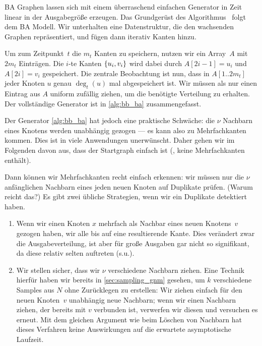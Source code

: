 BA Graphen lassen sich mit einem überraschend einfachen Generator in Zeit linear in der Ausgabegröße erzeugen.
Das Grundgerüst des Algorithmus~\cite{batagelj2005efficient} folgt dem BA Modell.
Wir unterhalten eine Datenstruktur, die den wachsenden Graphen repräsentiert, und fügen dann iterativ Kanten hinzu.

Um zum Zeitpunkt~$t$ die $m_t$ Kanten zu speichern, nutzen wir ein Array~$A$ mit $2m_t$ Einträgen.
Die $i$-te Kanten $\left\{u_i, v_i\right\}$ wird dabei durch $A[2i - 1] = u_i$ und $A[2i] = v_i$ gespeichert.
Die zentrale Beobachtung ist nun, dass in $A[1 .. 2m_t]$ jeder Knoten $u$ genau $\deg_t(u)$ mal abgespeichert ist.
Wir müssen als nur einen Eintrag aus $A$ uniform zufällig ziehen, um die benötigte Verteilung zu erhalten.
Der vollständige Generator ist in \cref{alg:bb_ba} zusammengefasst.

Der Generator \cref{alg:bb_ba} hat jedoch eine praktische Schwäche:
die $\nu$ Nachbarn eines Knotens werden unabhängig gezogen --- es kann also zu Mehrfachkanten kommen.
Dies ist in viele Anwendungen unerwünscht.
Daher gehen wir im Folgenden davon aus, dass der Startgraph einfach ist (\dh, keine Mehrfachkanten enthält).

Dann können wir Mehrfachkanten recht einfach erkennen:
wir müssen nur die $\nu$ anfänglichen Nachbarn eines jeden neuen Knoten auf Duplikate prüfen.
(Warum reicht das?)
Es gibt zwei übliche Strategien, wenn wir ein Duplikate detektiert haben.

\begin{enumerate}
    \item Wenn wir einen Knoten $x$ mehrfach als Nachbar eines neuen Knotens~$v$ gezogen haben,  wir alle bis auf eine resultierende Kante.
          Dies verändert zwar die Ausgabeverteilung, ist aber für große Ausgaben gar nicht so signifikant, da diese relativ selten auftreten (s.u.).

    \item Wir stellen sicher, dass wir $\nu$ verschiedene Nachbarn ziehen.
          Eine Technik hierfür haben wir bereits in \cref{sec:sampling_gnm} gesehen, um $k$ verschiedene Samples aus $N$ ohne Zurücklegen zu erstellen:
          Wir ziehen einfach für den neuen Knoten~$v$ unabhängig neue Nachbarn;
          wenn wir einen Nachbarn ziehen, der bereits mit $v$ verbunden ist, verwerfen wir diesen und versuchen es erneut.
          Mit dem gleichen Argument wie beim Löschen von Nachbarn hat dieses Verfahren keine Auswirkungen auf die erwartete asymptotische Laufzeit.

\end{enumerate}

